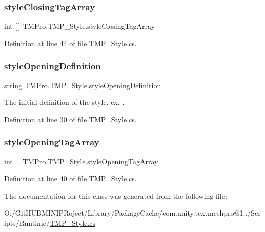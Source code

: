 \subsubsection{\texorpdfstring{styleClosingTagArray}{styleClosingTagArray}}
{\footnotesize\ttfamily int \mbox{[}$\,$\mbox{]} T\+M\+Pro.\+T\+M\+P\+\_\+\+Style.\+style\+Closing\+Tag\+Array\hspace{0.3cm}{\ttfamily [get]}}



Definition at line 44 of file T\+M\+P\+\_\+\+Style.\+cs.

\mbox{\label{class_t_m_pro_1_1_t_m_p___style_a9ad5821b0ddc0a5e6c0e82da84785afb}} 
\subsubsection{\texorpdfstring{styleOpeningDefinition}{styleOpeningDefinition}}
{\footnotesize\ttfamily string T\+M\+Pro.\+T\+M\+P\+\_\+\+Style.\+style\+Opening\+Definition\hspace{0.3cm}{\ttfamily [get]}}



The initial definition of the style. ex. {\bfseries{ \uline{. }}}



Definition at line 30 of file T\+M\+P\+\_\+\+Style.\+cs.

\mbox{\label{class_t_m_pro_1_1_t_m_p___style_a3f1234f2125d45029ccfb05d86690eae}} 
\subsubsection{\texorpdfstring{styleOpeningTagArray}{styleOpeningTagArray}}
{\footnotesize\ttfamily int \mbox{[}$\,$\mbox{]} T\+M\+Pro.\+T\+M\+P\+\_\+\+Style.\+style\+Opening\+Tag\+Array\hspace{0.3cm}{\ttfamily [get]}}



Definition at line 40 of file T\+M\+P\+\_\+\+Style.\+cs.



The documentation for this class was generated from the following file\+:\begin{DoxyCompactItemize}
\item 
O\+:/\+Git\+H\+U\+B\+M\+I\+N\+I\+P\+Roject/\+Library/\+Package\+Cache/com.\+unity.\+textmeshpro@1../\+Scripts/\+Runtime/\mbox{\hyperlink{_t_m_p___style_8cs}{T\+M\+P\+\_\+\+Style.\+cs}}\end{DoxyCompactItemize}

